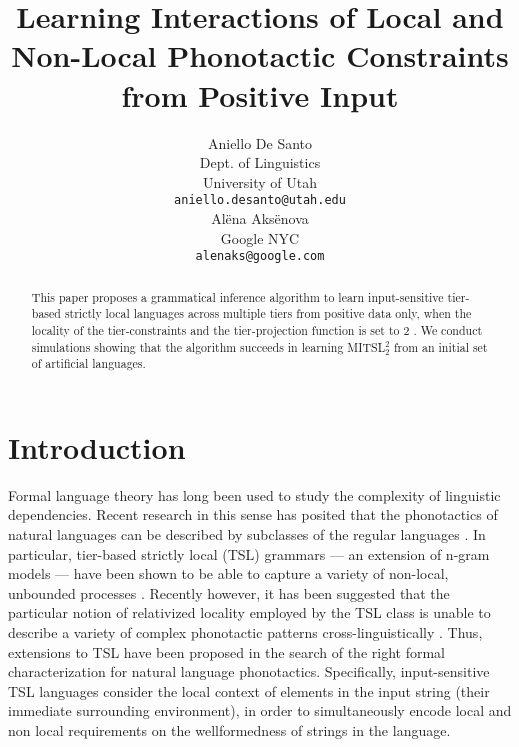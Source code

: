 \documentclass[11pt,a4paper]{article}
\title{Learning Interactions of Local and Non-Local Phonotactic Constraints from Positive Input}
\author{Aniello De Santo \\
  Dept. of Linguistics \\
  University of Utah \\
  \texttt{aniello.desanto@utah.edu} \\\And
  Al\"{e}na Aks\"{e}nova \\
  Google NYC \\
  \texttt{alenaks@google.com} \\}
\date{}
\begin{document}
\maketitle
\begin{abstract}
This paper proposes a grammatical  inference algorithm to learn input-sensitive tier-based strictly local languages across multiple tiers from positive data only, when the locality of the tier-constraints and the tier-projection function is set to $2$ \cite[MITSL$^2_2$;][]{desanto2019structure}.\@
We  conduct simulations showing that the algorithm succeeds in learning MITSL$^2_2$ from an initial set of artificial languages.\let\thefootnote\relax{}
\end{abstract}


\section{Introduction}

Formal language theory has long been used to study the complexity of linguistic dependencies.
Recent research in this sense has posited that the phonotactics of natural languages can be described by subclasses of the regular languages \citep[subregular classes;][]{Heinz2011a,Heinz2011b}.
In particular, tier-based strictly local (TSL) grammars  ---  an extension of n-gram models --- have been shown to be able to capture a variety of non-local, unbounded processes \cite{HeinzRawalTanner,McMullin16,McMullinHansson16}.
Recently however, it has been suggested that the particular notion of relativized locality employed by the TSL class is unable to describe a variety of complex phonotactic patterns cross-linguistically \citep[a.o.]{McMullin16,MayerMajor18}.
Thus, extensions to TSL have been proposed in the search of the right formal characterization for natural language phonotactics.
Specifically, input-sensitive TSL languages \citep[ITSL;][]{desanto2019structure} consider the local context of elements in the input string (their immediate surrounding environment), in order to simultaneously encode local and non local requirements on the wellformedness of strings in the language.
\end{document}
